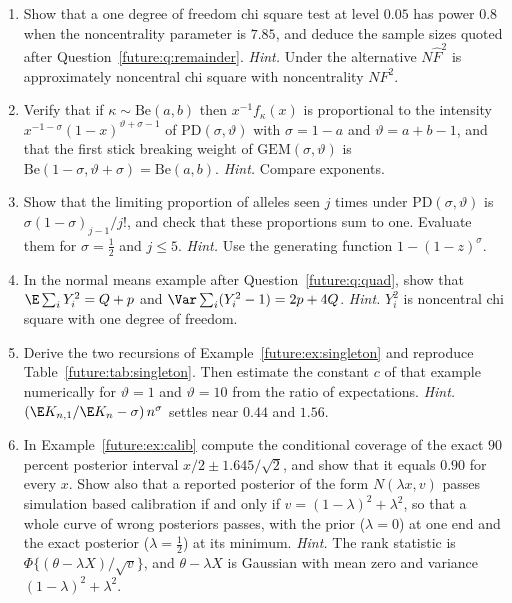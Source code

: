 \begin{enumerate}[label=\arabic*.,ref=\arabic*,leftmargin=*]

\item Show that a one degree of freedom chi square test at level $0.05$ has power $0.8$ when the
noncentrality parameter is $7.85$, and deduce the sample sizes quoted after
Question~\ref{future:q:remainder}. \emph{Hint.} Under the alternative $N\hat F^2$ is approximately
noncentral chi square with noncentrality $NF^2$.

\item Verify that if $\kappa\sim\mathrm{Be}(a,b)$ then $x^{-1}f_\kappa(x)$ is proportional to the
intensity $x^{-1-\sigma}(1-x)^{\vartheta+\sigma-1}$ of $\mathrm{PD}(\sigma,\vartheta)$ with
$\sigma=1-a$ and $\vartheta=a+b-1$, and that the first stick breaking weight of
$\mathrm{GEM}(\sigma,\vartheta)$ is $\mathrm{Be}(1-\sigma,\vartheta+\sigma)=\mathrm{Be}(a,b)$.
\emph{Hint.} Compare exponents.

\item Show that the limiting proportion of alleles seen $j$ times under $\mathrm{PD}(\sigma,\vartheta)$
is $\sigma(1-\sigma)_{j-1}/j!$, and check that these proportions sum to one. Evaluate them for
$\sigma=\tfrac12$ and $j\le5$. \emph{Hint.} Use the generating function $1-(1-z)^\sigma$.

\item In the normal means example after Question~\ref{future:q:quad}, show that
$\E\sum_iY_i^2=Q+p$ and $\Var\sum_i(Y_i^2-1)=2p+4Q$. \emph{Hint.} $Y_i^2$ is noncentral chi
square with one degree of freedom.

\item Derive the two recursions of Example~\ref{future:ex:singleton} and reproduce
Table~\ref{future:tab:singleton}. Then estimate the constant $c$ of that example numerically for $\vartheta=1$ and $\vartheta=10$ from the ratio of
expectations. \emph{Hint.} $(\E K_{n,1}/\E K_n-\sigma)\,n^{\sigma}$ settles near $0.44$ and $1.56$.

\item In Example~\ref{future:ex:calib} compute the conditional coverage of the exact $90$ percent
posterior interval $x/2\pm1.645/\sqrt2$, and show that it equals $0.90$ for every $x$. Show also
that a reported posterior of the form $N(\lambda x,v)$ passes simulation based calibration if
and only if $v=(1-\lambda)^2+\lambda^2$, so that a whole curve of wrong posteriors passes, with
the prior ($\lambda=0$) at one end and the exact posterior ($\lambda=\tfrac12$) at its minimum.
\emph{Hint.} The rank statistic is $\Phi\{(\theta-\lambda X)/\sqrt v\}$, and
$\theta-\lambda X$ is Gaussian with mean zero and variance $(1-\lambda)^2+\lambda^2$.


\end{enumerate}
